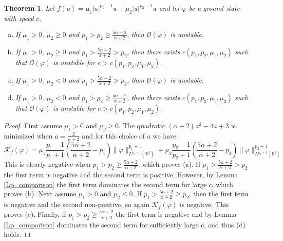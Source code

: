 \documentclass[10pt]{article}
\numberwithin{equation}{section}
\newtheorem{theorem}{\quad Theorem}[section]
\newcommand{\ff}{\varphi}
\begin{document}
	\vskip 10pt
	\begin{theorem} Let $f(u)=\mu_1|u|^{p_1-1}u+\mu_2|u|^{p_2-1}u$ and let $\ff$ be a ground state with speed $c$. 
		\begin{enumerate}[(a)]
			\item If $\mu_1>0$, $\mu_2\geq0$ and $p_1>p_2\geq \frac{5\alpha+2}{\alpha+2}$, then $\mathcal{O}(\ff)$ is unstable.
			\item If $\mu_1>0$, $\mu_2\geq0$ and $p_1>\frac{5\alpha+2}{\alpha+2}>p_2$, then there exists $c(p_1,p_2,\mu_1,\mu_2)$ such that $\mathcal{O}(\ff)$ is unstable for $c>c(p_1,p_2,\mu_1,\mu_2)$.
			\item If $\mu_1>0$, $\mu_2<0$ and $p_1>\frac{5\alpha+2}{\alpha+2}>p_2$, then $\mathcal{O}(\ff)$ is unstable.
			\item If $\mu_1>0$, $\mu_2<0$ and $p_1>p_2\geq\frac{5\alpha+2}{\alpha+2}$, then there exists $c(p_1,p_2,\mu_1,\mu_2)$ such that $\mathcal{O}(\ff)$ is unstable for $c>c(p_1,p_2,\mu_1,\mu_2)$.
		\end{enumerate}
	\end{theorem}
	
	\vskip 10pt
	
	
	\begin{proof} 
		First assume $\mu_1>0$ and $\mu_2\geq0$. 
		The quadratic $(\alpha+2)a^2-4a+3$ is minimized when $a=\frac{2}{\alpha+2}$ and for this choice of $a$ we have 
		\[
		\mathcal{K}_f(\ff)=
		\mu_1\frac{p_1-1}{p_1+1}\left(\frac{5\alpha+2}{\alpha+2}-p_1\right)\|\ff\|_{L^{p_1+1}(\mathbb R^2)}^{p_1+1}+\mu_2\frac{p_2-1}{p_2+1}\left(\frac{5\alpha+2}{\alpha+2}-p_2\right)\|\ff\|_{L^{p_2+1}(\mathbb R^2)}^{p_2+1}
		\]
		This is clearly negative when  $p_1>p_2\geq \frac{5\alpha+2}{\alpha+2}$, which proves (a). If $p_1>\frac{5\alpha+2}{\alpha+2}>p_2$ the first term is negative and the second term is positive. However, by Lemma \ref{Lp_comparison} the first term dominates the second term for large $c$, which proves (b). Next assume $\mu_1>0$ and  $\mu_2\leq0$. If $p_1>\frac{5\alpha+2}{\alpha+2}\geq p_2$, then the first term is negative and the second non-positive, so again $\mathcal{K}_f(\ff)$ is negative. This proves (c). Finally, if $p_1>p_2\geq\frac{5\alpha+2}{\alpha+2}$ the first term is negative and by Lemma \ref{Lp_comparison} dominates the second term for sufficiently large $c$, and thus (d) holds. 
	\end{proof}
	
\end{document}
